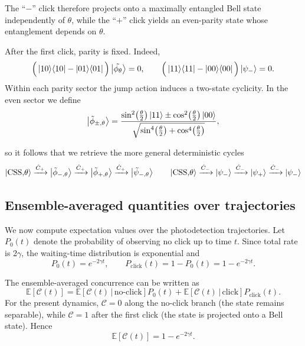 The ``$-$'' click therefore projects onto a maximally entangled Bell state independently of $\theta$,
while the ``$+$'' click yields an even-parity state whose entanglement depends on $\theta$.

After the first click, parity is fixed. Indeed,
\begin{equation}
	\Big(\ket{10}\!\bra{10}-\ket{01}\!\bra{01}\Big)\ket{\tilde{\phi_\theta}}=0,
	\qquad
	\Big(\ket{11}\!\bra{11}-\ket{00}\!\bra{00}\Big)\ket{\psi_-}=0.
\end{equation}
Within each parity sector the jump action induces a two-state cyclicity.
In the even sector we define
\begin{equation}
	\ket{\tilde{\phi}_{\pm,\theta}}
	=
	\frac{
		\sin^{2}\!\left(\frac{\theta}{2}\right)\ket{11}
		\pm
		\cos^{2}\!\left(\frac{\theta}{2}\right)\ket{00}
	}{
		\sqrt{
			\sin^{4}\!\left(\frac{\theta}{2}\right)
			+
			\cos^{4}\!\left(\frac{\theta}{2}\right)
		}
	},
	\label{Post_click_CSS_C+}
\end{equation}

so it follows that we retrieve the more general deterministic cycles
\begin{equation}
	\ket{\mathrm{CSS,}\theta}\xrightarrow{\Cp}\ket{\tilde{\phi}_{-,\theta}}\xrightarrow{\Cp}\ket{\tilde{\phi}_{+,\theta}} \xrightarrow{\Cp}\ket{\tilde{\psi}_{-,\theta}}%
	\qquad
	\ket{\mathrm{CSS,}\theta}\xrightarrow{\Cm}\ket{\psi_-}\xrightarrow{\Cm}\ket{\psi_+}\xrightarrow{\Cm}\ket{\psi_-}%
	\label{eq:cycles}
\end{equation}



\subsection{Ensemble-averaged quantities over trajectories}
We now compute expectation values over the photodetection trajectories.
Let $P_0(t)$ denote the probability of observing no click up to time $t$.
Since total rate is 2$\gamma$, the waiting-time distribution is exponential and
\begin{equation}
	P_0(t)=e^{-2\gamma t},
	\qquad
	P_{\mathrm{click}}(t)=1-P_0(t)=1-e^{-2\gamma t}.
\end{equation}

The ensemble-averaged concurrence can be written as
\begin{equation}
	\mathbb{E}\!\left[\mathcal{C}(t)\right]
	=
	\mathbb{E}\!\left[\mathcal{C}(t)\,\big|\,\text{no-click}\right]P_0(t)
	+
	\mathbb{E}\!\left[\mathcal{C}(t)\,\big|\,\text{click}\right]P_{\mathrm{click}}(t).
\end{equation}
For the present dynamics, $\mathcal{C}=0$ along the no-click branch (the state remains separable),
while $\mathcal{C}=1$ after the first click (the state is projected onto a Bell state). Hence
\begin{equation}
		\mathbb{E}\!\left[\mathcal{C}(t)\right]
		=
		1-e^{-2\gamma t}.
\end{equation}

